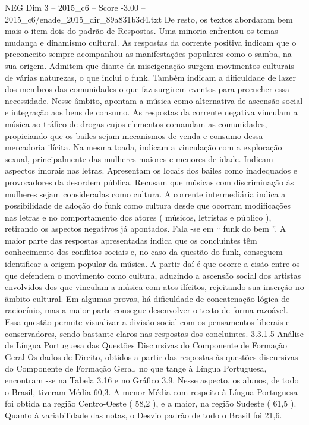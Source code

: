 \begin{textsample}{NEG Dim 3 – 2015\_c6 – Score -3.00 – 2015\_c6/enade\_2015\_dir\_89a831b3d4.txt}
De resto, os textos abordaram bem mais o item dois do padrão de Respostas.
Uma minoria enfrentou os temas mudança e dinamismo cultural.
As respostas da corrente positiva indicam que o preconceito sempre acompanhou as manifestações populares como o samba, na sua origem.
Admitem que diante da miscigenação surgem movimentos culturais de várias naturezas, o que inclui o funk.
Também indicam a dificuldade de lazer dos membros das comunidades o que faz surgirem eventos para preencher essa necessidade.
Nesse âmbito, apontam a música como alternativa de ascensão social e integração aos bens de consumo.
As respostas da corrente negativa vinculam a música ao tráfico de drogas cujos elementos comandam as comunidades, propiciando que os bailes sejam mecanismos de venda e consumo dessa mercadoria ilícita.
Na mesma toada, indicam a vinculação com a exploração sexual, principalmente das mulheres maiores e menores de idade.
Indicam aspectos imorais nas letras.
Apresentam os locais dos bailes como inadequados e provocadores da desordem pública.
Recusam que músicas com discriminação às mulheres sejam consideradas como cultura.
A corrente intermediária indica a possibilidade de adoção do funk como cultura desde que ocorram modificações nas letras e no comportamento dos atores ( músicos, letristas e público ), retirando os aspectos negativos já apontados.
Fala -se em “ funk do bem ”.
A maior parte das respostas apresentadas indica que os concluintes têm conhecimento dos conflitos sociais e, no caso da questão do funk, conseguem identificar a origem popular da música.
A partir daí é que ocorre a cisão entre os que defendem o movimento como cultura, aduzindo a ascensão social dos artistas envolvidos dos que vinculam a música com atos ilícitos, rejeitando sua inserção no âmbito cultural.
Em algumas provas, há dificuldade de concatenação lógica de raciocínio, mas a maior parte consegue desenvolver o texto de forma razoável.
Essa questão permite visualizar a divisão social com os pensamentos liberais e conservadores, sendo bastante claros nas respostas dos concluintes. 3.3.1.5 Análise de Língua Portuguesa das Questões Discursivas do Componente de Formação Geral Os dados de Direito, obtidos a partir das respostas às questões discursivas do Componente de Formação Geral, no que tange à Língua Portuguesa, encontram -se na Tabela 3.16 e no Gráfico 3.9.
Nesse aspecto, os alunos, de todo o Brasil, tiveram Média 60,3.
A menor Média com respeito à Língua Portuguesa foi obtida na região Centro-Oeste ( 58,2 ), e a maior, na região Sudeste ( 61,5 ).
Quanto à variabilidade das notas, o Desvio padrão de todo o Brasil foi 21,6.

\end{textsample}
